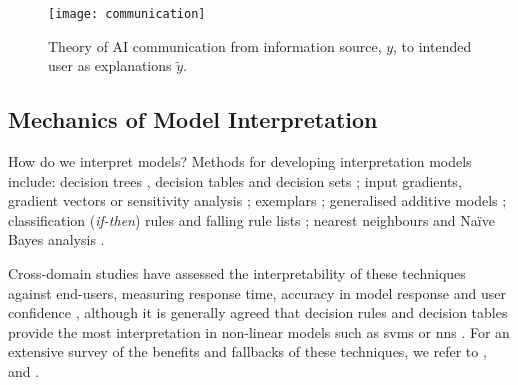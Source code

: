 \begin{figure}[hbt]
  \centering
  \texttt{[image: communication]}
  \caption[Theory of AI communication]{Theory of AI communication from information source, $y$, to intended user as explanations $\tilde{y}$.}
  \label{fig:background:probabilistic-stochastic:theory-of-ai-communication}
\end{figure}

\subsection{Mechanics of Model Interpretation}
\label{ssec:background:probabilistic-stochastic:mechanics}

How do we interpret models? Methods for developing interpretation models include: decision trees \citep{Breiman:1984tu,Hastie:2001wp,Craven:1995wg,Quinlan:1993vi,Rokach:2008wc}, decision tables \citep{Lima:2009tm,Baesens:2003we} and decision sets \citep{Lakkaraju:2016ka,Narayanan:2018ud}; input gradients, gradient vectors or sensitivity analysis \citep{Selvaraju:2017bk,Ribeiro:2016gg,Lei:2016wi,Ross:2017vn,Baehrens:2010tj}; exemplars \citep{Kim:2014ui,Frey:2007hs}; generalised additive models \citep{Caruana:2015jk}; classification (\textit{if-then}) rules \citep{Thrun:1996wh,Bramer:2007vg,Clark:1991vi,Otero:2013ul,Witten:2016ut} and falling rule lists \citep{Singh:2016wu}; nearest neighbours \citep{Martens:2011uh,Sen:1995uk,Suri:2007wl,Wettschereck:1997vw,Zhang:2008vfa} and Na\"{i}ve Bayes analysis \citep{Bellazzi:2008tv,Lavrac:1999tf,Kononenko:1993td,Zupan:2000tp,Michie:1994wi,Friedman:1997vs,Cheng:2001vw,Heckerman:2000uw}. 

Cross-domain studies have assessed the interpretability of these techniques against end-users, measuring response time, accuracy in model response and user confidence \citep{Huysmans:2011gq,Hayete:2005tn,Allahyari:2011ud,Subramanian:1992ue,Schwabacher:2001wc,Freitas:2010vk,Martens:2011uh,Verbeke:2011vo}, although it is generally agreed that decision rules and decision tables provide the most interpretation in non-linear models such as \glspl{svm} or \glspl{nn} \citep{Freitas:2010vk,Martens:2011uh,Verbeke:2011vo}. For an extensive survey of the benefits and fallbacks of these techniques, we refer to \citet{Freitas:2014ic}, \citet{DoshiVelez:2017vm} and \citet{DoshiVelez:2017wu}.
